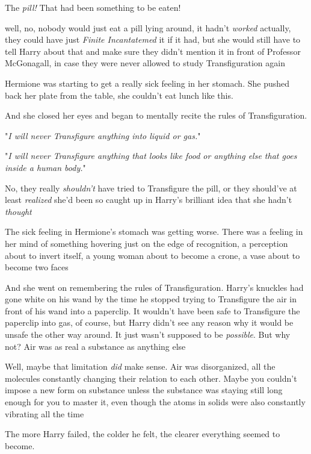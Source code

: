 The \emph{pill!} That had been something to be eaten!

{\el} well, no, nobody would just eat a pill lying around, it hadn't
\emph{worked} actually, they could have just \emph{Finite Incantatemed} it if
it had, but she would still have to tell Harry about that and make sure they
didn't mention it in front of Professor McGonagall, in case they were never
allowed to study Transfiguration again{\el}

Hermione was starting to get a really sick feeling in her stomach. She pushed
back her plate from the table, she couldn't eat lunch like this.

And she closed her eyes and began to mentally recite the rules of
Transfiguration.

"\emph{I will never Transfigure anything into liquid or gas.}"

"\emph{I will never Transfigure anything that looks like food or anything else
that goes inside a human body.}"

No, they really \emph{shouldn't} have tried to Transfigure the pill, or they
should've at least \emph{realized{\el}} she'd been so caught up in Harry's
brilliant idea that she hadn't \emph{thought{\el}}

The sick feeling in Hermione's stomach was getting worse. There was a feeling
in her mind of something hovering just on the edge of recognition, a perception
about to invert itself, a young woman about to become a crone, a vase about to
become two faces{\el}

And she went on remembering the rules of Transfiguration.
\sbreak
Harry's knuckles had gone white on his wand by the time he stopped trying to
Transfigure the air in front of his wand into a paperclip. It wouldn't have
been safe to Transfigure the paperclip into gas, of course, but Harry didn't
see any reason why it would be unsafe the other way around. It just wasn't
supposed to be \emph{possible}. But why not? Air was as real a substance as
anything else{\el}

Well, maybe that limitation \emph{did} make sense. Air was disorganized, all
the molecules constantly changing their relation to each other. Maybe you
couldn't impose a new form on substance unless the substance was staying still
long enough for you to master it, even though the atoms in solids were also
constantly vibrating all the time{\el}

The more Harry failed, the colder he felt, the clearer everything seemed to
become.

